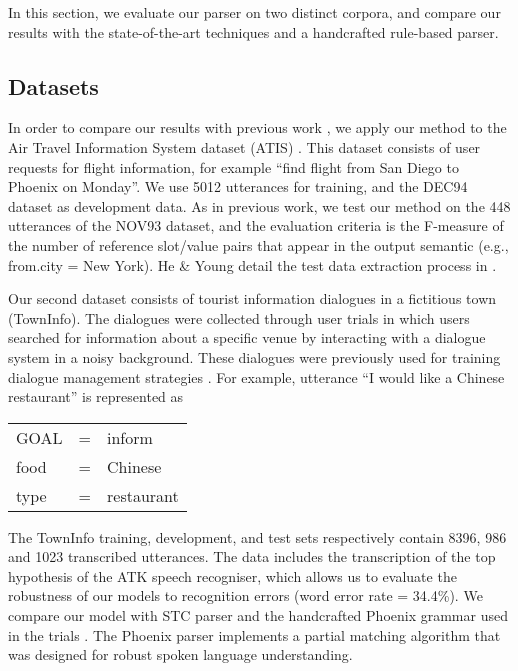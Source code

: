 \documentclass{article}
\begin{document}
In this section, we evaluate our parser on two distinct corpora, and compare our results with the state-of-the-art techniques and a handcrafted rule-based parser. 

\subsection{Datasets}

In order to compare our results with previous work \cite{mairesse09, he05,zettlemoyer07,meza08b},
we apply our method to the Air Travel Information System dataset
(ATIS) \cite{atis94}. This dataset consists of user requests for flight information, for example ``find flight from San Diego to Phoenix on Monday''. We use 5012 utterances for training, and the DEC94 dataset as development data. As in previous work, we test our method on the 448 utterances of the NOV93 dataset, and the evaluation criteria is the F-measure of the number of reference slot/value pairs that appear in the output semantic (e.g., from.city = New York). He \& Young detail the test data extraction process in \cite{he05}.

Our second dataset consists of tourist information dialogues in a fictitious town (TownInfo). The dialogues were collected through user trials in which users searched for information about a specific venue by interacting with a dialogue system in a noisy background. These dialogues were previously used for training dialogue management strategies \cite{williams07,thomson08}. 
For example, utterance ``I would like a Chinese restaurant'' is represented as

\vspace{.15cm}
\begin{tabular}{lll}
  GOAL       & = & inform \\
  food       & = & Chinese \\
  type       & = & restaurant \\
\end{tabular} 
\vspace{.15cm}

The TownInfo training, development, and test sets respectively contain 8396, 986 and 1023 transcribed utterances.  The data includes the transcription of the top hypothesis of the ATK speech recogniser, which allows us to evaluate the robustness of our models to recognition errors (word error rate = 34.4\%). 
We compare our model with STC parser \cite{mairesse09} and the handcrafted Phoenix grammar \cite{ward91} used in the trials \cite{williams07,thomson08}. The Phoenix parser implements a partial matching algorithm that was designed for robust spoken language understanding.
\end{document}

